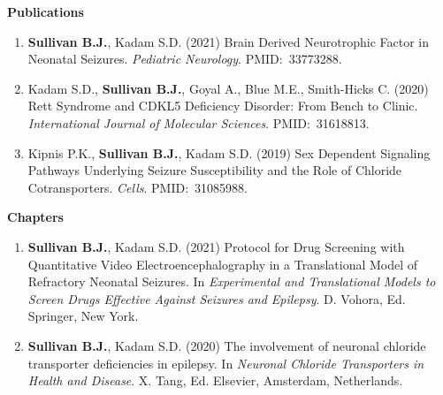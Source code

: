 \documentclass{resume} %
\begin{document}
\begin{rSection}{{\bfseries Publications}}
    \begin{enumerate}[leftmargin=2em, itemsep=2pt, parsep=0pt, topsep=2pt, partopsep=0pt]
        \item {\bfseries Sullivan B.J.}, Kadam S.D. (2021) Brain Derived Neurotrophic Factor in Neonatal Seizures. \emph{Pediatric Neurology}. PMID:~33773288.
        \item Kadam S.D., {\bfseries Sullivan B.J.}, Goyal A., Blue M.E., Smith-Hicks C. (2020) Rett Syndrome and CDKL5 Deficiency Disorder: From Bench to Clinic. \emph{International Journal of Molecular Sciences}. PMID:~31618813.
        \item Kipnis P.K., {\bfseries Sullivan B.J.}, Kadam S.D. (2019) Sex Dependent Signaling Pathways Underlying Seizure Susceptibility and the Role of Chloride Cotransporters. \emph{Cells}. PMID:~31085988.
    \end{enumerate}

    {\bfseries Chapters}

    \begin{enumerate}[leftmargin=2em, itemsep=2pt, parsep=0pt, topsep=2pt, partopsep=0pt]
        \item {\bfseries Sullivan B.J.}, Kadam S.D. (2021) Protocol for Drug Screening with Quantitative Video Electroencephalography in a Translational Model of Refractory Neonatal Seizures. In \emph{Experimental and Translational Models to Screen Drugs Effective Against Seizures and Epilepsy}. D. Vohora, Ed. Springer, New York.
        \item {\bfseries Sullivan B.J.}, Kadam S.D. (2020) The involvement of neuronal chloride transporter deficiencies in epilepsy. In \emph{Neuronal Chloride Transporters in Health and Disease}. X. Tang, Ed. Elsevier, Amsterdam, Netherlands.
    \end{enumerate}     
\end{rSection}
\end{document}
